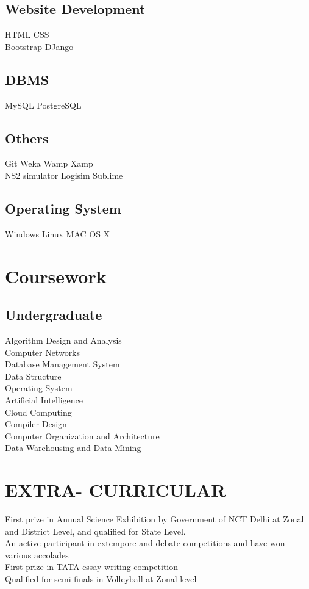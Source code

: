 \documentclass[]{resume-openfont}
\begin{document}
\begin{minipage}[t]{0.28\textwidth}
\subsection{Website Development}
HTML \textbullet{} CSS \\
Bootstrap \textbullet{} DJango
\sectionsep
\subsection{DBMS}
MySQL \textbullet{} PostgreSQL
\sectionsep
\subsection{Others}
Git \textbullet{} Weka\textbullet{} Wamp \textbullet{} Xamp \\
\textbullet{} NS2 simulator \textbullet{} Logisim \textbullet{} Sublime
\sectionsep
\subsection{Operating System}
Windows \textbullet{} Linux \textbullet{} MAC OS X
\sectionsep


\section{Coursework}
\subsection{Undergraduate}
Algorithm Design and Analysis \\
Computer Networks \\
Database Management System \\
Data Structure \\
Operating System \\
Artificial Intelligence \\
Cloud Computing \\
Compiler Design \\
Computer Organization and Architecture \\
Data Warehousing and Data Mining 
\sectionsep


\section{EXTRA- CURRICULAR}
\textbullet{} First prize in Annual Science Exhibition by Government of NCT Delhi at Zonal and District Level, and qualified for State Level. \\
\textbullet{} An active participant in extempore and debate competitions and have won various accolades \\
\textbullet{} First prize in TATA essay writing competition \\
\textbullet{} Qualified for semi-finals in Volleyball at Zonal level
\sectionsep


\end{minipage}
\end{document}
